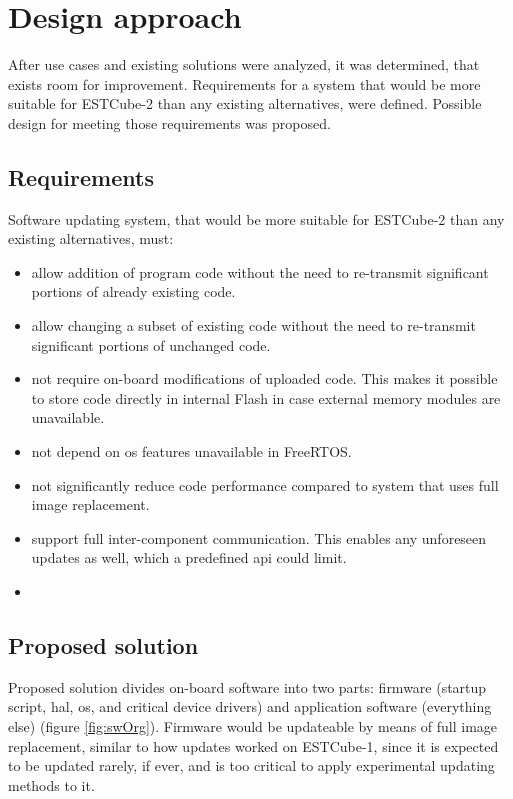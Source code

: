 \newpage
\section{Design approach}

After use cases and existing solutions were analyzed, it was determined, that exists room for improvement. Requirements for a system that would be more suitable for ESTCube-2 than any existing alternatives, were defined. Possible design for meeting those requirements was proposed.

\subsection{Requirements}

Software updating system, that would be more suitable for ESTCube-2 than any existing alternatives, must:

\begin{itemize}
	\item allow addition of program code without the need to re-transmit significant portions of already existing code.
	\item allow changing a subset of existing code without the need to re-transmit significant portions of unchanged code.
	\item not require on-board modifications of uploaded code. This makes it possible to store code directly in internal Flash in case external memory modules are unavailable. 
	\item not depend on \gls{os} features unavailable in FreeRTOS.
	\item not significantly reduce code performance compared to system that uses full image replacement.
	\item support full inter-component communication. This enables any unforeseen updates as well, which a predefined \gls{api} could limit.
	\item {}
\end{itemize}

\subsection{Proposed solution}

Proposed solution divides on-board software into two parts: firmware (startup script, \gls{hal}, \gls{os}, and critical device drivers) and application software (everything else) (figure \ref{fig:swOrg}). Firmware would be updateable by means of full image replacement, similar to how updates worked on ESTCube-1, since it is expected to be updated rarely, if ever, and is too critical to apply experimental updating methods to it. 

